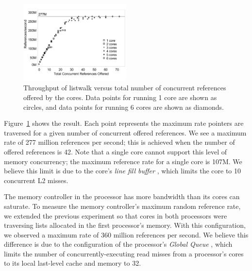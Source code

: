 \documentclass{acm_proc_article-sp}
\begin{document}
\begin{figure}[h]
	\begin{center}
		\includegraphics[width=0.5\textwidth]{figures/multi-listwalk-totalconc-edited.pdf}
	\end{center}
	\caption{Throughput of listwalk versus total number of
          concurrent references offered by the cores. Data points for
          running 1 core are shown as circles, and data points for
          running 6 cores are shown as diamonds. 
        }
	\label{fig:listwalk-totalconc}
\end{figure}

Figure~\ref{fig:listwalk-totalconc} shows the result. Each point represents
the maximum rate pointers are traversed for a given number of
concurrent offered references. We see a maximum rate of 277 million
references per second; this is achieved when the number of offered
references is 42. Note that a single core cannot support this level of
memory concurrency; the maximum reference rate for a single core is
107M. We believe this limit is due to the core's {\em line fill
  buffer} , which limits the core to 10
concurrent L2 misses.

The memory controller in the processor has more bandwidth than its
cores can saturate. To measure the memory controller's maximum random
reference rate, we extended the previous experiment so that cores in
both processors were traversing lists allocated in the first processor's
memory. With this configuration, we observed a maximum rate of 360
million references per second. We believe this difference is due to
the configuration of the processor's {\em Global Queue} , which limits the number of concurrently-executing read misses
from a processor's cores to its local last-level cache and memory to 32.
\end{document}
